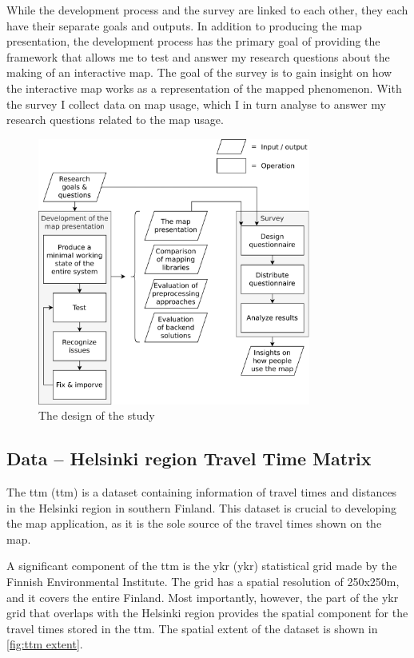 While the development process and the survey are linked to each other,
they each have their separate goals and outputs.
In addition to producing the map presentation,
the development process has the primary goal of providing the framework
that allows me to test and answer my research questions
about the making of an interactive map.
The goal of the survey is to gain insight on
how the interactive map works as a representation of the mapped phenomenon.
With the survey I collect data on map usage,
which I in turn analyse to answer my research questions related to the map usage.

\begin{figure}[H]
	\centering
	\includegraphics[width=0.8\textwidth]{visual/figures/diagrams/study_design.png}
	\caption{The design of the study}
	\label{fig:study design}
\end{figure}


\subsection{Data -- Helsinki region Travel Time Matrix}

The \acrlong{ttm} (\acrshort{ttm}) \parencite{fin2023}
is a dataset containing information of travel times and distances
in the Helsinki region in southern Finland.
This dataset is crucial to developing the map application,
as it is the sole source of the travel times shown on the map.

A significant component of the \acrshort{ttm} is the \acrlong{ykr} (\acrshort{ykr})
statistical grid made by the Finnish Environmental Institute.
The grid has a spatial resolution of 250x250m, and it covers the entire Finland.
Most importantly, however, the part of the \acrshort{ykr} grid that overlaps with
the Helsinki region provides the spatial component for
the travel times stored in the \acrshort{ttm}.
The spatial extent of the dataset is shown in \ref{fig:ttm extent}.

